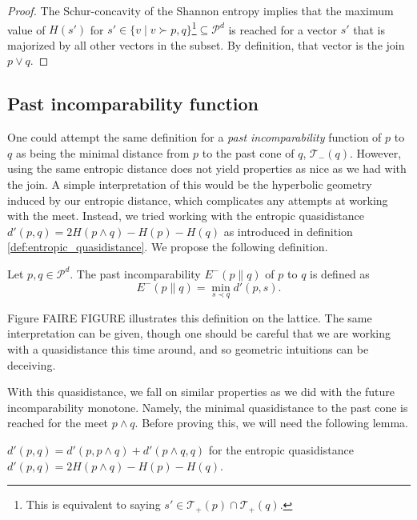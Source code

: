 \begin{proof}
    \noindent The Schur-concavity of the Shannon entropy implies that the maximum value of $H(s')$ for $s' \in \{v \mid v \succ p, q\}$\footnote{This is equivalent to saying $s' \in \mathcal{T}_+(p) \cap \mathcal{T}_+(q)$.}$ \subseteq \mathcal{P}^d$ is reached for a vector $s'$ that is majorized by all other vectors in the subset. By definition, that vector is the join $p \vee q$. \qedhere
\end{proof}



\subsection{Past incomparability function}

One could attempt the same definition for a \textit{past incomparability} function of $p$ to $q$ as being the minimal distance from $p$ to the past cone of $q$, $\mathcal{T}_-(q)$. However, using the same entropic distance does not yield properties as nice as we had with the join. A simple interpretation of this would be the hyperbolic geometry induced by our entropic distance, which complicates any attempts at working with the meet. Instead, we tried working with the entropic quasidistance $d'(p, q) = 2H(p \wedge q) - H(p) - H(q)$ as introduced in definition \ref{def:entropic_quasidistance}. We propose the following definition.

\begin{definition}
    Let $p, q \in \mathcal{P}^d$. The past incomparability $E^-(p \parallel q)$ of $p$ to $q$ is defined as
    \begin{equation}
        E^- (p \parallel q) = \min_{s \prec q} d'(p, s).
    \end{equation}
\end{definition}

Figure FAIRE FIGURE illustrates this definition on the lattice. The same interpretation can be given, though one should be careful that we are working with a quasidistance this time around, and so geometric intuitions can be deceiving.

With this quasidistance, we fall on similar properties as we did with the future incomparability monotone. Namely, the minimal quasidistance to the past cone is reached for the meet $p \wedge q$. Before proving this, we will need the following lemma.

\begin{lemma} \label{lem:comp_past}
    $d'(p, q) = d'(p, p \wedge q) + d'(p \wedge q, q)$ for the entropic quasidistance $d'(p, q) = 2H(p \wedge q) - H(p) - H(q)$.
\end{lemma}

